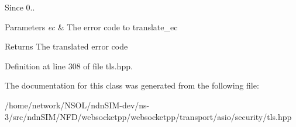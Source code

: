 \begin{DoxySince}{Since}
0..
\end{DoxySince}

\begin{DoxyParams}{Parameters}
{\em ec} & The error code to translate\+\_\+ec \\
\hline
\end{DoxyParams}
\begin{DoxyReturn}{Returns}
The translated error code 
\end{DoxyReturn}


Definition at line 308 of file tls.\+hpp.



The documentation for this class was generated from the following file\+:\begin{DoxyCompactItemize}
\item 
/home/network/\+N\+S\+O\+L/ndn\+S\+I\+M-\/dev/ns-\/3/src/ndn\+S\+I\+M/\+N\+F\+D/websocketpp/websocketpp/transport/asio/security/tls.\+hpp\end{DoxyCompactItemize}
